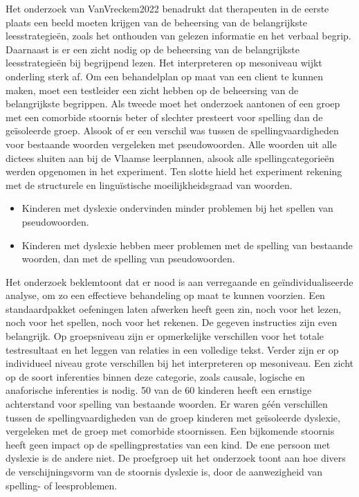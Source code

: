 Het onderzoek van VanVreckem2022 benadrukt dat therapeuten in de eerste plaats een beeld moeten krijgen van de beheersing van de belangrijkste leesstrategieën, zoals het onthouden van gelezen informatie en het verbaal begrip. Daarnaast is er een zicht nodig op de beheersing van de belangrijkste leesstrategieën bij begrijpend lezen. Het interpreteren op mesoniveau wijkt onderling sterk af. Om een behandelplan op maat van een client te  kunnen maken, moet een testleider een zicht hebben op de beheersing van de belangrijkste begrippen. Als tweede moet het onderzoek aantonen of een groep met een comorbide stoornis beter of slechter presteert voor spelling dan de geïsoleerde groep. Alsook of er een verschil was tussen de spellingvaardigheden voor bestaande woorden vergeleken met pseudowoorden. Alle woorden uit alle dictees sluiten aan bij de Vlaamse leerplannen, alsook alle spellingcategorieën werden opgenomen in het experiment. Ten slotte hield het experiment rekening met de structurele en linguïstische moeilijkheidsgraad van woorden.

\begin{itemize}
	\item Kinderen met dyslexie ondervinden minder problemen bij het spellen van pseudowoorden.
	\item Kinderen met dyslexie hebben meer problemen met de spelling van bestaande woorden, dan met de spelling van pseudowoorden.
\end{itemize}

Het onderzoek beklemtoont dat er nood is aan verregaande en geïndividualiseerde analyse, om zo een effectieve behandeling op maat te kunnen voorzien. Een standaardpakket oefeningen laten afwerken heeft geen zin, noch voor het lezen, noch voor het spellen, noch voor het rekenen. De gegeven instructies zijn even belangrijk. Op groepsniveau zijn er opmerkelijke verschillen voor het totale testresultaat en het leggen van relaties in een volledige tekst. Verder zijn er op individueel niveau grote verschillen bij het interpreteren op mesoniveau. Een zicht op de soort inferenties binnen deze categorie, zoals causale, logische en anaforische inferenties is nodig. 50 van de 60 kinderen heeft een ernstige achterstand voor spelling van bestaande woorden. Er waren géén verschillen tussen de spellingvaardigheden van de groep kinderen met geïsoleerde dyslexie, vergeleken met de groep met comorbide stoornissen. Een bijkomende stoornis heeft geen impact op de spellingprestaties van een kind. De ene persoon met dyslexie is de andere niet. De proefgroep uit het onderzoek toont aan hoe divers de verschijningsvorm van de stoornis dyslexie is, door de aanwezigheid van spelling- of leesproblemen.


